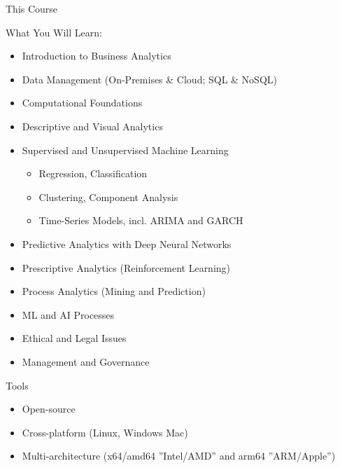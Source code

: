 \documentclass[ignorenonframetext,xcolor=dvipsnames]{beamer}
\begin{document}
\begin{frame}[label=full]{This Course}

\footnotesize

\begin{block}{What You Will Learn:}
\begin{itemize}
  \item Introduction to Business Analytics
  \item Data Management (On-Premises \& Cloud; SQL \& NoSQL)
  \item Computational Foundations
  \item Descriptive and Visual Analytics
  \item Supervised and Unsupervised Machine Learning 
  \begin{itemize}
    \footnotesize
    \item Regression, Classification
    \item Clustering, Component Analysis
    \item Time-Series Models, incl. ARIMA and GARCH
  \end{itemize}
  \item Predictive Analytics with Deep Neural Networks
  \item Prescriptive Analytics (Reinforcement Learning)
  \item Process Analytics (Mining and Prediction)
  \item ML and AI Processes
  \item Ethical and Legal Issues
  \item Management and Governance
\end{itemize}
\end{block}
\end{frame}

\begin{frame}[label=withcode]{Tools}

\begin{itemize}
  \item Open-source
  \item Cross-platform (Linux, Windows Mac)
  \item Multi-architecture (x64/amd64 ''Intel/AMD'' and arm64 ''ARM/Apple'')
\end{itemize}
\end{frame}
\end{document}
